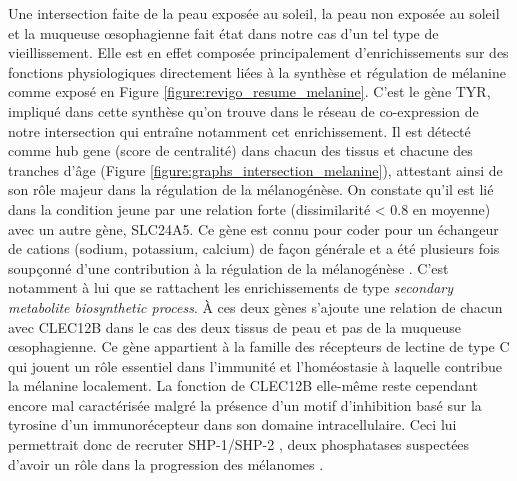 Une intersection faite de la peau exposée au soleil, la peau non exposée au soleil et la muqueuse œsophagienne fait état dans notre cas d'un tel type de vieillissement. 
Elle est en effet composée principalement d'enrichissements sur des fonctions physiologiques directement liées à la synthèse et régulation de mélanine comme exposé en Figure \ref{figure:revigo_resume_melanine}. 
C'est le gène TYR, impliqué dans cette synthèse qu'on trouve dans le réseau de co-expression de notre intersection qui entraîne notamment cet enrichissement. Il est détecté comme hub gene (score de centralité) dans chacun des tissus et chacune des tranches d'âge (Figure \ref{figure:graphs_intersection_melanine}), attestant ainsi de son rôle majeur dans la régulation de la mélanogénèse. On constate qu'il est lié dans la condition jeune par une relation forte (dissimilarité < 0.8 en moyenne) avec un autre gène, SLC24A5. Ce gène est connu pour coder pour un échangeur de cations (sodium, potassium, calcium) de façon générale et a été plusieurs fois soupçonné d'une contribution à la régulation de la mélanogénèse \cite{Zhang2019,Ginger2008}. C'est notamment à lui que se rattachent les enrichissements de type \textit{secondary metabolite biosynthetic process}. 
À ces deux gènes s'ajoute une relation de chacun avec CLEC12B dans le cas des deux tissus de peau et pas de la muqueuse œsophagienne. Ce gène appartient à la famille des récepteurs de lectine de type C qui jouent un rôle essentiel dans l'immunité et l'homéostasie à laquelle contribue la mélanine localement. La fonction de CLEC12B elle-même reste cependant encore mal caractérisée malgré la présence d'un motif d'inhibition basé sur la tyrosine d'un immunorécepteur dans son domaine intracellulaire. Ceci lui permettrait donc de recruter SHP-1/SHP-2 \cite{Hoffmann2007Aug, Tone2019}, deux phosphatases suspectées d'avoir un rôle dans la progression des mélanomes \cite{Zhang2013}. 


